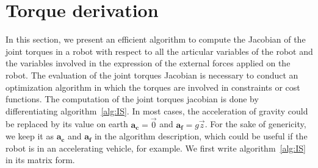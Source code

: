 


\section{Torque derivation}
\label{sec:torque_derivation}


In this section, we present an efficient algorithm to compute the Jacobian of the joint torques in a robot with respect to all the articular variables of the robot and the variables involved in the expression of the external forces applied on the robot.
The evaluation of the joint torques Jacobian is necessary to conduct an optimization algorithm in which the torques are involved in constraints or cost functions.
The computation of the joint torques jacobian is done by differentiating algorithm~\ref{alg:IS}.
In most cases, the acceleration of gravity could be replaced by its value on earth $\mathbf{a_c} = \vec{0}$ and $\mathbf{a_f} = g \vec{z}$.
For the sake of genericity, we keep it as $\mathbf{a_c}$ and $\mathbf{a_f}$ in the algorithm description, which could be useful if the robot is in an accelerating vehicle, for example.
We first write algorithm~\ref{alg:IS} in its matrix form.

